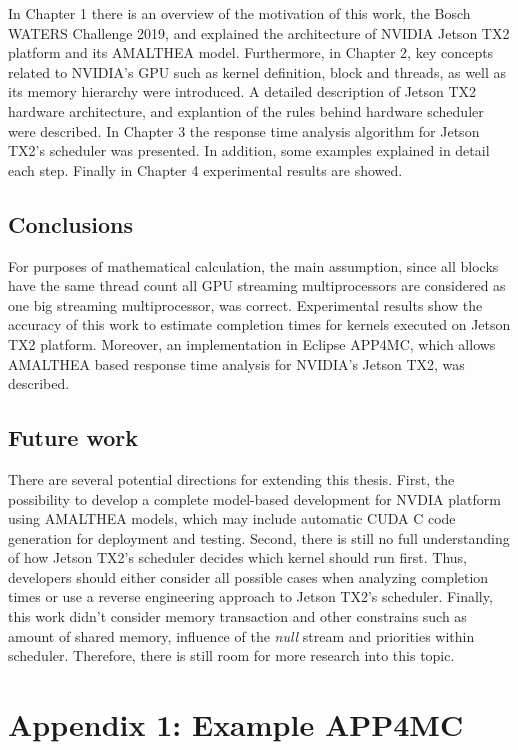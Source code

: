\documentclass[
  12pt,
  a4paperpaper,
]{report}
\begin{document}
In Chapter 1 there is an overview of the motivation of this work, the
Bosch WATERS Challenge 2019, and explained the architecture of NVIDIA Jetson
TX2 platform and its AMALTHEA model. Furthermore, in Chapter 2, 
key concepts related to NVIDIA's GPU such as kernel
definition, block and threads, as well as its memory hierarchy were introduced.
A detailed description of Jetson TX2 hardware architecture, and explantion of the
rules behind hardware scheduler were described.
In Chapter 3 the response time analysis algorithm for Jetson TX2's scheduler was presented.
In addition, some examples  explained in detail each step. 
Finally in Chapter 4 experimental results are showed.

\hypertarget{conclusions}{%
\section{Conclusions}\label{conclusions}}

For purposes of mathematical calculation, the main assumption, since all blocks have the same thread count all GPU streaming multiprocessors are considered as one big streaming multiprocessor, was correct.
Experimental results show the accuracy of this work to estimate completion times for kernels executed on Jetson TX2 platform.
Moreover, an implementation in Eclipse APP4MC, which allows AMALTHEA based response time analysis for NVIDIA's Jetson TX2, was described.

\hypertarget{future-work}{%
\section{Future work}\label{future-work}}

There are several potential directions for extending this thesis. First,
the possibility to develop a complete model-based development for NVDIA
platform using AMALTHEA models, which may include automatic CUDA C code
generation for deployment and testing. Second, there is still no full
understanding of how Jetson TX2's scheduler decides which kernel should
run first. Thus, developers should either consider all possible cases
when analyzing completion times or use a reverse engineering approach to Jetson TX2's
scheduler. Finally, this work didn't consider memory transaction and other
constrains such as amount of shared memory, influence of the \emph{null}
stream and priorities within scheduler. Therefore, there is still room
for more research into this topic.

\hypertarget{appendix-1-example-app4mc}{%
\chapter*{Appendix 1: Example APP4MC}\label{appendix-1-example-app4mc}}
\end{document}
